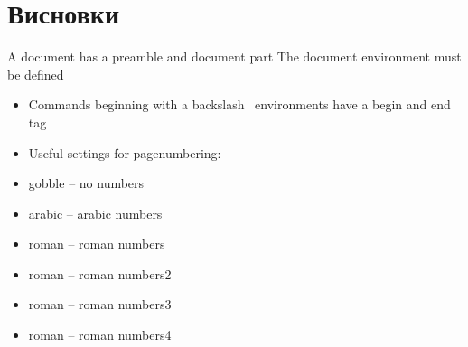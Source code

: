 
\section{Висновки}

A document has a preamble and document part
The document environment must be defined
\begin{itemize}
	\item Commands beginning with a backslash \, environments have a begin and end tag
	\item Useful settings for pagenumbering:
	\item gobble – no numbers
	\item arabic – arabic numbers
	\item roman – roman numbers
	\item roman – roman numbers2
	\item roman – roman numbers3
	\item roman – roman numbers4
\end{itemize}
